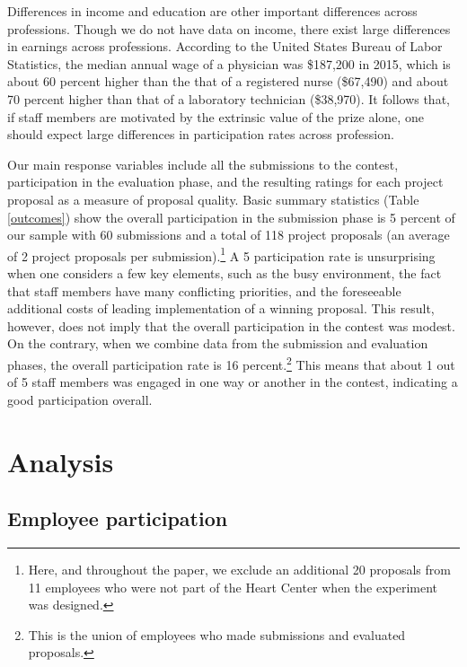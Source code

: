 \documentclass[11pt, titlepage]{article}
\begin{document}
Differences in income and education are other important differences
across professions. Though we do not have data on income, there exist
large differences in earnings across professions. According to the
United States Bureau of Labor Statistics, the median annual wage of a
physician was \$187,200 in 2015, which is about 60 percent higher than
the that of a registered nurse (\$67,490) and about 70 percent higher
than that of a laboratory technician (\$38,970). It follows that, if
staff members are motivated by the extrinsic value of the prize alone,
one should expect large differences in participation rates across
profession.



Our main response variables include all the submissions to the contest,
participation in the evaluation phase, and the resulting ratings for
each project proposal as a measure of proposal quality. Basic summary
statistics (Table \ref{outcomes}) show the overall participation in the
submission phase is 5 percent of our sample with 60 submissions and a
total of 118 project proposals (an average of 2 project proposals per
submission).\footnote{Here, and throughout the paper, we exclude an
  additional 20 proposals from 11 employees who were not part of the
  Heart Center when the experiment was designed.} A 5 participation rate
is unsurprising when one considers a few key elements, such as the busy
environment, the fact that staff members have many conflicting
priorities, and the foreseeable additional costs of leading
implementation of a winning proposal. This result, however, does not
imply that the overall participation in the contest was modest. On the
contrary, when we combine data from the submission and evaluation
phases, the overall participation rate is 16 percent.\footnote{This is
  the union of employees who made submissions and evaluated proposals.}
This means that about 1 out of 5 staff members was engaged in one way or
another in the contest, indicating a good participation overall.

\section{Analysis}\label{analysis}

\subsection{Employee participation}\label{employee-participation}
\end{document}
